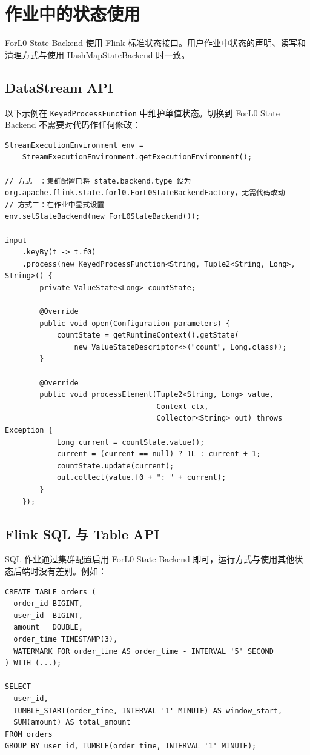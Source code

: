 \documentclass[a4paper,11pt]{article}
\newcommand{\project}{ForL0 State Backend}
\begin{document}
\section{作业中的状态使用}

\project{} 使用 Flink 标准状态接口。用户作业中状态的声明、读写和清理方式与使用 HashMapStateBackend 时一致。

\subsection{DataStream API}

以下示例在 \texttt{KeyedProcessFunction} 中维护单值状态。切换到 \project{} 不需要对代码作任何修改：

\begin{lstlisting}[language=javalang]
StreamExecutionEnvironment env =
    StreamExecutionEnvironment.getExecutionEnvironment();

// 方式一：集群配置已将 state.backend.type 设为 org.apache.flink.state.forl0.ForL0StateBackendFactory，无需代码改动
// 方式二：在作业中显式设置
env.setStateBackend(new ForL0StateBackend());

input
    .keyBy(t -> t.f0)
    .process(new KeyedProcessFunction<String, Tuple2<String, Long>, String>() {
        private ValueState<Long> countState;

        @Override
        public void open(Configuration parameters) {
            countState = getRuntimeContext().getState(
                new ValueStateDescriptor<>("count", Long.class));
        }

        @Override
        public void processElement(Tuple2<String, Long> value,
                                   Context ctx,
                                   Collector<String> out) throws Exception {
            Long current = countState.value();
            current = (current == null) ? 1L : current + 1;
            countState.update(current);
            out.collect(value.f0 + ": " + current);
        }
    });
\end{lstlisting}

\subsection{Flink SQL 与 Table API}

SQL 作业通过集群配置启用 \project{} 即可，运行方式与使用其他状态后端时没有差别。例如：

\begin{lstlisting}[language=yamlcmd]
CREATE TABLE orders (
  order_id BIGINT,
  user_id  BIGINT,
  amount   DOUBLE,
  order_time TIMESTAMP(3),
  WATERMARK FOR order_time AS order_time - INTERVAL '5' SECOND
) WITH (...);

SELECT
  user_id,
  TUMBLE_START(order_time, INTERVAL '1' MINUTE) AS window_start,
  SUM(amount) AS total_amount
FROM orders
GROUP BY user_id, TUMBLE(order_time, INTERVAL '1' MINUTE);
\end{lstlisting}
\end{document}
